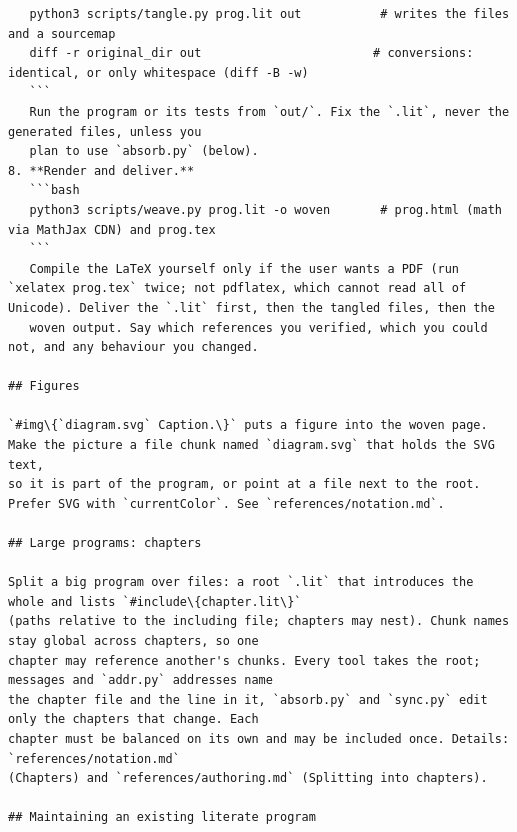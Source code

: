 \documentclass[10pt,a4paper]{article}
\newcounter{chunk}
\begin{document}
\begin{Verbatim}
   python3 scripts/tangle.py prog.lit out           # writes the files and a sourcemap
   diff -r original_dir out                        # conversions: identical, or only whitespace (diff -B -w)
   ```
   Run the program or its tests from `out/`. Fix the `.lit`, never the generated files, unless you
   plan to use `absorb.py` (below).
8. **Render and deliver.**
   ```bash
   python3 scripts/weave.py prog.lit -o woven       # prog.html (math via MathJax CDN) and prog.tex
   ```
   Compile the LaTeX yourself only if the user wants a PDF (run `xelatex prog.tex` twice; not pdflatex, which cannot read all of Unicode). Deliver the `.lit` first, then the tangled files, then the
   woven output. Say which references you verified, which you could not, and any behaviour you changed.

## Figures

`#img\{`diagram.svg` Caption.\}` puts a figure into the woven page. Make the picture a file chunk named `diagram.svg` that holds the SVG text,
so it is part of the program, or point at a file next to the root. Prefer SVG with `currentColor`. See `references/notation.md`.

## Large programs: chapters

Split a big program over files: a root `.lit` that introduces the whole and lists `#include\{chapter.lit\}`
(paths relative to the including file; chapters may nest). Chunk names stay global across chapters, so one
chapter may reference another's chunks. Every tool takes the root; messages and `addr.py` addresses name
the chapter file and the line in it, `absorb.py` and `sync.py` edit only the chapters that change. Each
chapter must be balanced on its own and may be included once. Details: `references/notation.md`
(Chapters) and `references/authoring.md` (Splitting into chapters).

## Maintaining an existing literate program


\end{Verbatim}
\end{document}
